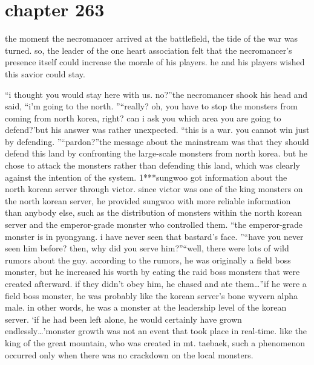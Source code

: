 \section{chapter 263}

                            the moment the necromancer arrived at the battlefield, the tide of the war was turned.
 so, the leader of the one heart association felt that the necromancer’s presence itself could increase the morale of his players.
 he and his players wished this savior could stay.





“i thought you would stay here with us.
 no?”the necromancer shook his head and said, “i’m going to the north.
”“really? oh, you have to stop the monsters from coming from north korea, right? can i ask you which area you are going to defend?’but his answer was rather unexpected.
“this is a war.
 you cannot win just by defending.
”“pardon?”the message about the mainstream was that they should defend this land by confronting the large-scale monsters from north korea.
but he chose to attack the monsters rather than defending this land, which was clearly against the intention of the system.
1***sungwoo got information about the north korean server through victor.
since victor was one of the king monsters on the north korean server, he provided sungwoo with more reliable information than anybody else, such as the distribution of monsters within the north korean server and the emperor-grade monster who controlled them.
“the emperor-grade monster is in pyongyang.
 i have never seen that bastard’s face.
”“have you never seen him before? then, why did you serve him?”“well, there were lots of wild rumors about the guy.
 according to the rumors, he was originally a field boss monster, but he increased his worth by eating the raid boss monsters that were created afterward.
 if they didn’t obey him, he chased and ate them…”if he were a field boss monster, he was probably like the korean server’s bone wyvern alpha male.
 in other words, he was a monster at the leadership level of the korean server.
‘if he had been left alone, he would certainly have grown endlessly…’monster growth was not an event that took place in real-time.
 like the king of the great mountain, who was created in mt.
 taebaek, such a phenomenon occurred only when there was no crackdown on the local monsters.

